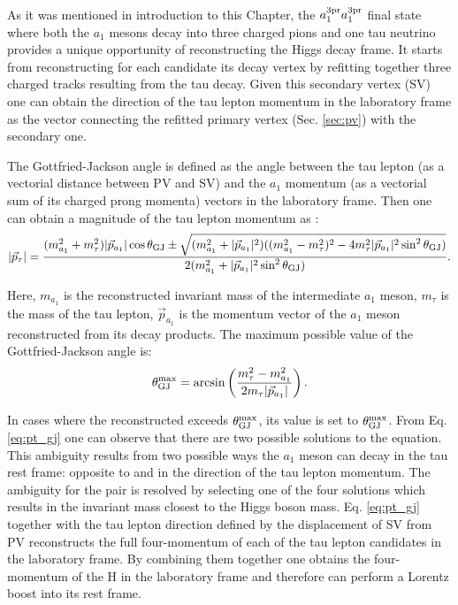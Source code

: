 As it was mentioned in introduction to this Chapter, the $a_1^\text{3pr} a_1^\text{3pr}$ final state where both the $a_1$ mesons decay into three charged pions and one tau neutrino provides a unique opportunity of reconstructing the Higgs decay frame. It starts from reconstructing for each \tauh candidate its decay vertex by refitting together three charged tracks resulting from the tau decay. Given this secondary vertex (SV) one can obtain the direction of the tau lepton momentum in the laboratory frame as the vector connecting the refitted primary vertex (Sec. \ref{sec:pv}) with the secondary one. 

The Gottfried-Jackson angle \gj is defined as the angle between the tau lepton (as a vectorial distance between PV and SV) and the $a_1$ momentum (as a vectorial sum of its charged prong momenta) vectors in the laboratory frame. Then one can obtain a magnitude of the tau lepton momentum as \cite{Cherepanov:2018npf}:
\begin{equation}\label{eq:pt_gj}
    |\vec{p}_\tau| = \dfrac{(m^2_{a_1} + m^2_\tau)|\vec{p}_{a_1}|\cos\theta_\text{GJ} \pm \sqrt{(m^2_{a_1}+|\vec{p}_{a_1}|^2)((m^2_{a_1} - m^2_\tau)^2 - 4m^2_\tau|\vec{p}_{a_1}|^2\sin^2\theta_\text{GJ})}}{2(m^2_{a_1}+|\vec{p}_{a_1}|^2\sin^2\theta_\text{GJ})}.
\end{equation}

Here, $m_{a_1}$ is the reconstructed invariant mass of the intermediate $a_1$ meson, $m_\tau$ is the mass of the tau lepton, $\vec{p}_{a_1}$ is the momentum vector of the $a_1$ meson reconstructed from its decay products. The maximum possible value of the Gottfried-Jackson angle is:
\begin{equation}
    \theta_\text{GJ}^\text{max} = \arcsin\left(\dfrac{m_\tau^2 - m_{a_1}^2}{2m_\tau|\vec{p}_{a_1}|}\right).
\end{equation}

In cases where the reconstructed \gj exceeds $\theta_\text{GJ}^\text{max}$, its value is set to  $\theta_\text{GJ}^\text{max}$. From Eq. \ref{eq:pt_gj} one can observe that there are two possible solutions to the equation. This ambiguity results from two possible ways the $a_1$ meson can decay in the tau rest frame: opposite to and in the direction of the tau lepton momentum. The ambiguity for the \aaa pair is resolved by selecting one of the four solutions which results in the invariant mass closest to the Higgs boson mass. Eq. \ref{eq:pt_gj} together with the tau lepton direction defined by the displacement of SV from PV reconstructs the full four-momentum of each of the tau lepton candidates in the laboratory frame. By combining them together one obtains the four-momentum of the H in the laboratory frame and therefore can perform a Lorentz boost into its rest frame.

